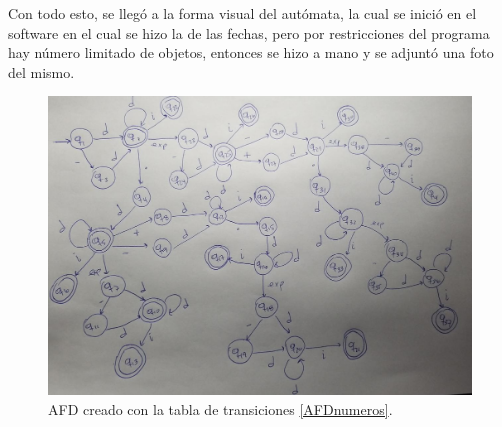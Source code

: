 Con todo esto, se llegó a la forma visual del autómata, la cual se inició en el software en el cual se hizo la de las fechas, pero por restricciones del programa hay número limitado de objetos, entonces se hizo a mano y se adjuntó una foto del mismo.

\begin{figure}[H]
	\centering
	\includegraphics[scale=0.35]{Images/AFDnumeros.jpeg}
	\caption{AFD creado con la tabla de transiciones \ref{AFDnumeros}.}
	\label{AFDimagen}
\end{figure}









